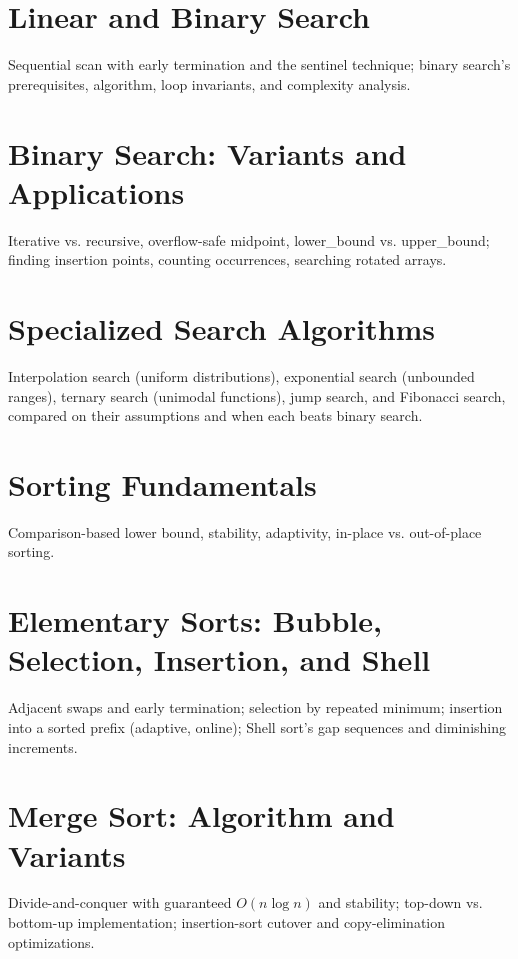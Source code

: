 
\chapter{Linear and Binary Search}
Sequential scan with early termination and the sentinel technique; binary search's prerequisites, algorithm, loop invariants, and complexity analysis.

\chapter{Binary Search: Variants and Applications}
Iterative vs. recursive, overflow-safe midpoint, lower\_bound vs. upper\_bound; finding insertion points, counting occurrences, searching rotated arrays.

\chapter{Specialized Search Algorithms}
Interpolation search (uniform distributions), exponential search (unbounded ranges), ternary search (unimodal functions), jump search, and Fibonacci search, compared on their assumptions and when each beats binary search.

\chapter{Sorting Fundamentals}
Comparison-based lower bound, stability, adaptivity, in-place vs. out-of-place sorting.

\chapter{Elementary Sorts: Bubble, Selection, Insertion, and Shell}
Adjacent swaps and early termination; selection by repeated minimum; insertion into a sorted prefix (adaptive, online); Shell sort's gap sequences and diminishing increments.

\chapter{Merge Sort: Algorithm and Variants}
Divide-and-conquer with guaranteed $O(n \log n)$ and stability; top-down vs. bottom-up implementation; insertion-sort cutover and copy-elimination optimizations.


